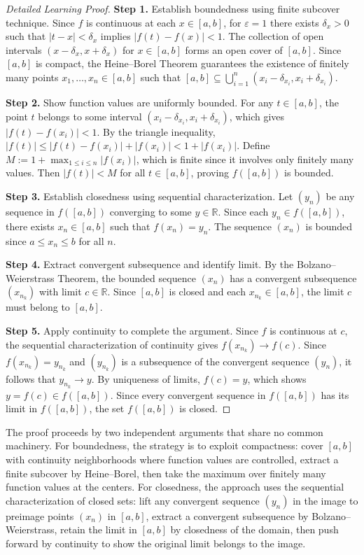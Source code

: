 \begin{proof}[Detailed Learning Proof]
\LRAProofBodyStart

\textbf{Step 1.} Establish boundedness using finite subcover technique. Since $f$ is continuous at each $x \in [a,b]$, for $\varepsilon = 1$ there exists $\delta_x > 0$ such that $|t - x| < \delta_x$ implies $|f(t) - f(x)| < 1$. The collection of open intervals $(x - \delta_x, x + \delta_x)$ for $x \in [a,b]$ forms an open cover of $[a,b]$. Since $[a,b]$ is compact, the Heine--Borel Theorem guarantees the existence of finitely many points $x_1, \ldots, x_n \in [a,b]$ such that $[a,b] \subseteq \bigcup_{i=1}^{n} (x_i - \delta_{x_i}, x_i + \delta_{x_i})$.

\textbf{Step 2.} Show function values are uniformly bounded. For any $t \in [a,b]$, the point $t$ belongs to some interval $(x_i - \delta_{x_i}, x_i + \delta_{x_i})$, which gives $|f(t) - f(x_i)| < 1$. By the triangle inequality, $|f(t)| \leq |f(t) - f(x_i)| + |f(x_i)| < 1 + |f(x_i)|$. Define $M := 1 + \max_{1 \leq i \leq n} |f(x_i)|$, which is finite since it involves only finitely many values. Then $|f(t)| < M$ for all $t \in [a,b]$, proving $f([a,b])$ is bounded.

\textbf{Step 3.} Establish closedness using sequential characterization. Let $(y_n)$ be any sequence in $f([a,b])$ converging to some $y \in \mathbb{R}$. Since each $y_n \in f([a,b])$, there exists $x_n \in [a,b]$ such that $f(x_n) = y_n$. The sequence $(x_n)$ is bounded since $a \leq x_n \leq b$ for all $n$.

\textbf{Step 4.} Extract convergent subsequence and identify limit. By the Bolzano--Weierstrass Theorem, the bounded sequence $(x_n)$ has a convergent subsequence $(x_{n_k})$ with limit $c \in \mathbb{R}$. Since $[a,b]$ is closed and each $x_{n_k} \in [a,b]$, the limit $c$ must belong to $[a,b]$.

\textbf{Step 5.} Apply continuity to complete the argument. Since $f$ is continuous at $c$, the sequential characterization of continuity gives $f(x_{n_k}) \to f(c)$. Since $f(x_{n_k}) = y_{n_k}$ and $(y_{n_k})$ is a subsequence of the convergent sequence $(y_n)$, it follows that $y_{n_k} \to y$. By uniqueness of limits, $f(c) = y$, which shows $y = f(c) \in f([a,b])$. Since every convergent sequence in $f([a,b])$ has its limit in $f([a,b])$, the set $f([a,b])$ is closed.
\end{proof}

\begin{remark*}
The proof proceeds by two independent arguments that share no common machinery. For boundedness, the strategy is to exploit compactness: cover $[a,b]$ with continuity neighborhoods where function values are controlled, extract a finite subcover by Heine--Borel, then take the maximum over finitely many function values at the centers. For closedness, the approach uses the sequential characterization of closed sets: lift any convergent sequence $(y_n)$ in the image to preimage points $(x_n)$ in $[a,b]$, extract a convergent subsequence by Bolzano--Weierstrass, retain the limit in $[a,b]$ by closedness of the domain, then push forward by continuity to show the original limit belongs to the image.
\end{remark*}

